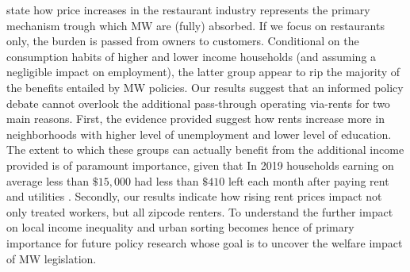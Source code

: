 \textcite{allegretto2018local} state how price increases in the restaurant industry represents the primary mechanism
trough which MW are (fully) absorbed.  If we focus on restaurants only, the burden is passed from owners to customers. 
Conditional on the consumption habits of higher and lower income households (and assuming a negligible impact on 
employment), the latter group appear to rip the majority of the benefits entailed by MW policies. Our results suggest that 
an informed policy debate cannot overlook the additional pass-through operating via-rents for two main reasons. 
First, the evidence provided suggest how rents increase more in neighborhoods with higher level of unemployment and 
lower level of education. The extent to which these groups can actually benefit from the additional income provided 
is of paramount importance, given that In 2019 households earning on average less than $\$15,000$ 
had less than $\$410$ left each month after paying rent and utilities \parencite{fernald2020americas}. Secondly, our 
results indicate how rising rent prices impact not only treated workers, but all zipcode renters. To understand  the further 
impact on local income inequality and urban sorting becomes hence of primary importance for future policy research 
whose goal is to uncover the welfare impact of MW legislation. 




 